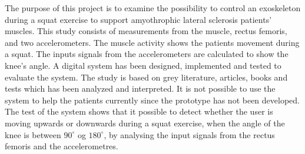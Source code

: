 The purpose of this project is to examine the possibility to control an exoskeleton during a squat exercise to support amyothrophic lateral sclerosis patients' muscles. This study consists of measurements from the muscle, rectus femoris, and two accelerometers. The muscle activity shows the patients movement during a squat. The inputs signals from the accelerometers are calculated to show the knee's angle. A digital system has been designed, implemented and tested to evaluate the system. The study is based on grey literature, articles, books and tests which has been analyzed and interpreted. It is not possible to use the system to help the patients currently since the prototype has not been developed. The test of the system shows that it possible to detect whether the user is moving upwards or downwards during a squat exercise, when the angle of the knee is between $90^{\circ}$ og $180^{\circ}$, by analysing the input signals from the rectus femoris and the accelerometres. 